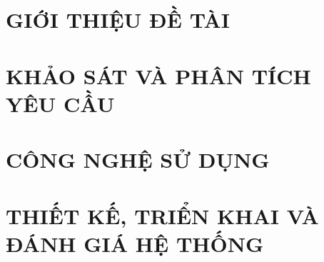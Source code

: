 \documentclass[a4paper,13pt,3p,twoside]{report}
\theoremstyle{definition}
\begin{document}
\glsaddall
\renewcommand*{\glossaryname}{Danh sách thuật ngữ}
\renewcommand*{\acronymname}{DANH MỤC THUẬT NGỮ VÀ TỪ VIẾT TẮT}
\renewcommand*{\entryname}{Thuật ngữ}
\renewcommand*{\descriptionname}{Ý nghĩa}
\printnoidxglossaries

%

% 


\newpage
{}

\pagestyle{fancy}
\fancyhf{}
\fancyhead[RE, LO]{\leftmark}
\fancyfoot[RE, LO]{\thepage}

\chapter{GIỚI THIỆU ĐỀ TÀI}
\label{chapter:Introduction}

\newpage
\chapter{KHẢO SÁT VÀ PHÂN TÍCH YÊU CẦU}
\label{chapter:Related_works}



\newpage
\chapter{CÔNG NGHỆ SỬ DỤNG}
\label{chapter:Methodology}


\newpage
\chapter{THIẾT KẾ, TRIỂN KHAI VÀ ĐÁNH GIÁ HỆ THỐNG}
\label{chapter:Experiment}


% 

\newpage
\end{document}
